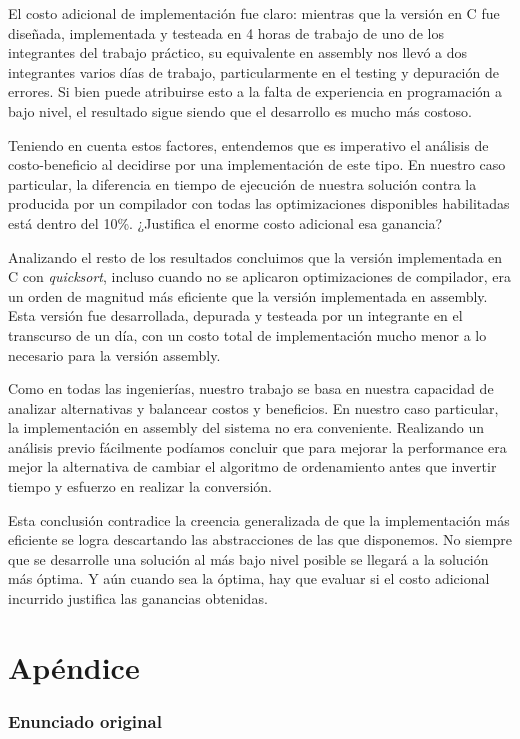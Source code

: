 \documentclass[a4paper,11pt]{article}
\begin{document}
El costo adicional de implementación fue claro: mientras que la versión en C
fue diseñada, implementada y testeada en 4 horas de trabajo de uno de los
integrantes del trabajo práctico, su equivalente en assembly nos llevó a dos
integrantes varios días de trabajo, particularmente en el testing y depuración
de errores. Si bien puede atribuirse esto a la falta de experiencia en
programación a bajo nivel, el resultado sigue siendo que el desarrollo es mucho
más costoso.

Teniendo en cuenta estos factores, entendemos que es imperativo el análisis de
costo-beneficio al decidirse por una implementación de este tipo. En nuestro
caso particular, la diferencia en tiempo de ejecución de nuestra solución
contra la producida por un compilador con todas las optimizaciones disponibles
habilitadas está dentro del 10\%. ¿Justifica el enorme costo adicional esa
ganancia?

Analizando el resto de los resultados concluimos que la versión implementada en
C con \textit{quicksort}, incluso cuando no se aplicaron optimizaciones de
compilador, era un orden de magnitud más eficiente que la versión implementada
en assembly. Esta versión fue desarrollada, depurada y testeada por un
integrante en el transcurso de un día, con un costo total de implementación
mucho menor a lo necesario para la versión assembly.

Como en todas las ingenierías, nuestro trabajo se basa en nuestra capacidad de
analizar alternativas y balancear costos y beneficios. En nuestro caso
particular, la implementación en assembly del sistema no era conveniente.
Realizando un análisis previo fácilmente podíamos concluir que para mejorar la
performance era mejor la alternativa de cambiar el algoritmo de ordenamiento
antes que invertir tiempo y esfuerzo en realizar la conversión.

Esta conclusión contradice la creencia generalizada de que la implementación
más eficiente se logra descartando las abstracciones de las que disponemos. No
siempre que se desarrolle una solución al más bajo nivel posible se llegará a
la solución más óptima. Y aún cuando sea la óptima, hay que evaluar si el costo
adicional incurrido justifica las ganancias obtenidas.

\clearpage

\part{Apéndice}
\appendix

\section{Enunciado original}\label{sec:enunciado}

\end{document}
